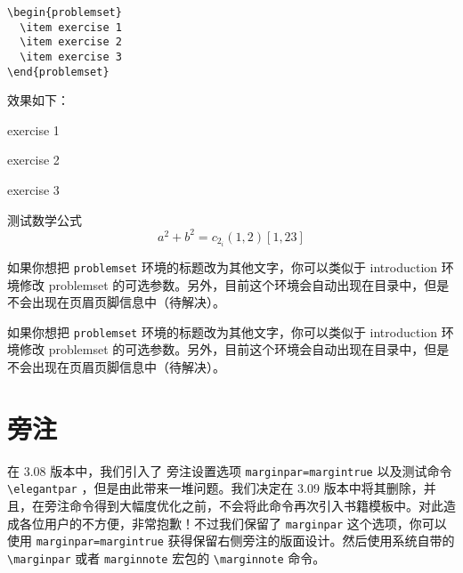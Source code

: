 \documentclass[cn,11pt]{elegantbook}
\begin{document}
\begin{lstlisting}
\begin{problemset}
  \item exercise 1
  \item exercise 2
  \item exercise 3
\end{problemset}
\end{lstlisting}


效果如下：
\begin{problemset}
  \item exercise 1
  \item exercise 2
  \item exercise 3
  \item 测试数学公式
  \begin{equation}
    a^2+b^2=c_{2_{i}} (1,2) [1,23]
  \end{equation}
\end{problemset}

\begin{remark}
如果你想把 \lstinline{problemset} 环境的标题改为其他文字，你可以类似于 introduction 环境修改 problemset 的可选参数。另外，目前这个环境会自动出现在目录中，但是不会出现在页眉页脚信息中（待解决）。
\end{remark}

\begin{solution}
如果你想把 \lstinline{problemset} 环境的标题改为其他文字，你可以类似于 introduction 环境修改 problemset 的可选参数。另外，目前这个环境会自动出现在目录中，但是不会出现在页眉页脚信息中（待解决）。
\end{solution}

\section{旁注}

在 3.08 版本中，我们引入了 旁注设置选项 \lstinline{marginpar=margintrue} 以及测试命令 \lstinline{\elegantpar} ，但是由此带来一堆问题。我们决定在 3.09 版本中将其删除，并且，在旁注命令得到大幅度优化之前，不会将此命令再次引入书籍模板中。对此造成各位用户的不方便，非常抱歉！不过我们保留了 \lstinline{marginpar} 这个选项，你可以使用 \lstinline{marginpar=margintrue} 获得保留右侧旁注的版面设计。然后使用系统自带的 \lstinline{\marginpar} 或者 \lstinline{marginnote} 宏包的 \lstinline{\marginnote} 命令。
\end{document}
